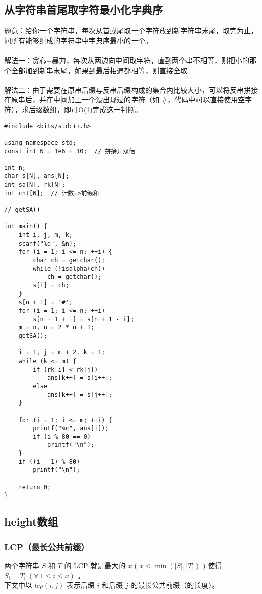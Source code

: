     \subsection{从字符串首尾取字符最小化字典序}
        题意：给你一个字符串，每次从首或尾取一个字符放到新字符串末尾，取完为止，问所有能够组成的字符串中字典序最小的一个。\\\\
        解法一：贪心+暴力，每次从两边向中间取字符，直到两个串不相等，则把小的那个全部加到新串末尾，如果到最后相遇都相等，则直接全取\\\\
        解法二：由于需要在原串后缀与反串后缀构成的集合内比较大小，可以将反串拼接在原串后，并在中间加上一个没出现过的字符（如 \#，代码中可以直接使用空字符），求后缀数组，即可O(1)完成这一判断。\\
\begin{lstlisting}
#include <bits/stdc++.h>

using namespace std;
const int N = 1e6 + 10;  // 拼接开双倍

int n;
char s[N], ans[N];
int sa[N], rk[N];
int cnt[N];  // 计数=>前缀和

// getSA()

int main() {
    int i, j, m, k;
    scanf("%d", &n);
    for (i = 1; i <= n; ++i) {
        char ch = getchar();
        while (!isalpha(ch))
            ch = getchar();
        s[i] = ch;
    }
    s[n + 1] = '#';
    for (i = 1; i <= n; ++i)
        s[n + 1 + i] = s[n + 1 - i];
    m = n, n = 2 * n + 1;
    getSA();

    i = 1, j = m + 2, k = 1;
    while (k <= m) {
        if (rk[i] < rk[j])
            ans[k++] = s[i++];
        else
            ans[k++] = s[j++];
    }

    for (i = 1; i <= m; ++i) {
        printf("%c", ans[i]);
        if (i % 80 == 0)
            printf("\n");
    }
    if ((i - 1) % 80)
        printf("\n");

    return 0;
}
\end{lstlisting}
    \subsection{height数组}
        \subsubsection{LCP（最长公共前缀）}
            两个字符串 $S$ 和 $T$ 的 LCP 就是最大的 $x$ ( $x\le \min(|S|, |T|)$ ) 使得 $S_i=T_i\ (\forall\ 1\le i\le x)$ 。\\
            下文中以 $lcp(i,j)$ 表示后缀 $i$ 和后缀 $j$ 的最长公共前缀（的长度）。
